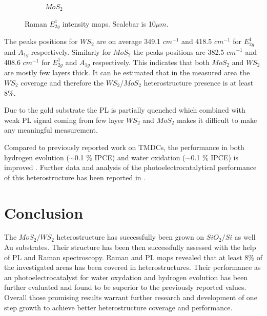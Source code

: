 \begin{figure}[H]
\begin{center}
\begin{subfigure}[b]{0.45\textwidth}
			\caption{$MoS_2$}
			\label{fig:HeterostructuresRamanIntensityEMoAu}
		\end{subfigure}
		\caption{Raman $E^1_{2g}$ intensity maps. Scalebar is 10$\mu m$.}
		\label{fig:HeterostructuresRamanIntensityEMaps}
	\end{center}
\end{figure}

The peaks positions for $WS_2$ are on average 349.1 $cm^{-1}$ and 418.5 $cm^{-1}$ for $E^1_{2g}$ and $A_{1g}$ respectively. Similarly for $MoS_2$ the peaks positions are 382.5 $cm^{-1}$ and 408.6 $cm^{-1}$ for $E^1_{2g}$ and $A_{1g}$ respectively. This indicates that both $MoS_2$ and $WS_2$ are mostly few layers thick. It can be estimated that in the measured area the $WS_2$ coverage and therefore the $WS_2$/$MoS_2$ heterostructure presence is at least 8{\%}.

Due to the gold substrate the PL is partially quenched which combined with weak PL signal coming from few layer $WS_2$ and $MoS_2$ makes it difficult to make any meaningful measurement.

Compared to previously reported work on TMDCs, the performance in both hydrogen evolution ($\sim$0.1 \% IPCE) and water oxidation ($\sim$0.1 \% IPCE) is improved \cite{Fu2015}. Further data and analysis of the photoelectrocatalytical performance of this heterostructure has been reported in \cite{Sherrell2019}.

\section{Conclusion}

The $MoS_2/WS_2$ heterostructure has successfully been grown on $SiO_2/Si$ as well Au substrates. Their structure has been then successfully assessed with the help of PL and Raman spectroscopy. Raman and PL maps revealed that at least 8\% of the investigated areas has been covered in heterostructures. Their performance as an photoelectrocatalyst for water oxydation and hydrogen evolution has been further evaluated and found to be superior to the previously reported values. Overall those promising results warrant further research and development of one step growth to achieve better heterostructure coverage and performance.
